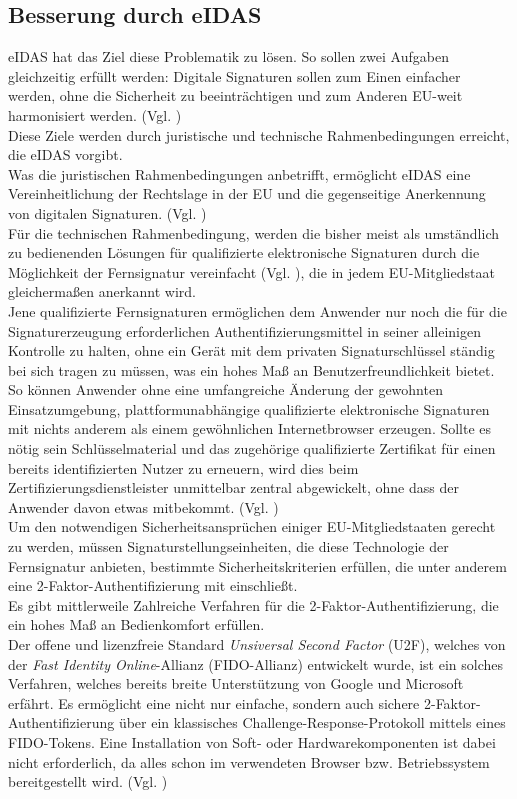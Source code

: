 \documentclass[deutsch]{lib/llncs/llncs}
\begin{document}
\subsection{Besserung durch eIDAS}
eIDAS hat das Ziel diese Problematik zu lösen. So sollen zwei Aufgaben gleichzeitig erfüllt werden: Digitale Signaturen sollen zum Einen einfacher werden, ohne die Sicherheit zu beeinträchtigen und zum Anderen EU-weit harmonisiert werden. (Vgl. \cite[S. 33]{Zitat08}) \\
Diese Ziele werden durch juristische und technische Rahmenbedingungen erreicht, die eIDAS vorgibt. \\
Was die juristischen Rahmenbedingungen anbetrifft, ermöglicht eIDAS eine Vereinheitlichung der Rechtslage in der EU und die gegenseitige Anerkennung von digitalen Signaturen. (Vgl. \cite[S. 33]{Zitat08}) \\
Für die technischen Rahmenbedingung, werden die bisher meist als umständlich zu bedienenden Lösungen für qualifizierte elektronische Signaturen durch die Möglichkeit der Fernsignatur vereinfacht (Vgl. \cite[S. 30]{Zitat08}), die in jedem EU-Mitgliedstaat gleichermaßen anerkannt wird. \\
Jene qualifizierte Fernsignaturen ermöglichen dem Anwender nur noch die für die Signaturerzeugung erforderlichen Authentifizierungsmittel in seiner alleinigen Kontrolle zu halten, ohne ein Gerät mit dem privaten Signaturschlüssel ständig bei sich tragen zu müssen, was ein hohes Maß an Benutzerfreundlichkeit bietet. So können Anwender ohne eine umfangreiche Änderung der gewohnten Einsatzumgebung, plattformunabhängige qualifizierte elektronische Signaturen mit nichts anderem als einem gewöhnlichen Internetbrowser erzeugen.  Sollte es nötig sein Schlüsselmaterial und das zugehörige qualifizierte Zertifikat für einen bereits identifizierten Nutzer zu erneuern, wird dies beim Zertifizierungsdienstleister unmittelbar zentral abgewickelt, ohne dass der Anwender davon etwas mitbekommt. (Vgl. \cite[S. 233-234]{Zitat09})\\
Um den notwendigen Sicherheitsansprüchen einiger EU-Mitgliedstaaten gerecht zu werden, müssen Signaturstellungseinheiten, die diese Technologie der Fernsignatur anbieten, bestimmte Sicherheitskriterien erfüllen, die unter anderem eine 2-Faktor-Authentifizierung mit einschließt. \\
Es gibt mittlerweile Zahlreiche Verfahren für die 2-Faktor-Authentifizierung, die ein hohes Maß an Bedienkomfort erfüllen. \\
Der offene und lizenzfreie Standard \textit{Unsiversal Second Factor} (U2F), welches von der \textit{Fast Identity Online}-Allianz (FIDO-Allianz) entwickelt wurde, ist ein solches Verfahren, welches bereits breite Unterstützung von Google und Microsoft erfährt. Es ermöglicht eine nicht nur einfache, sondern auch sichere 2-Faktor-Authentifizierung über ein klassisches Challenge-Response-Protokoll mittels eines FIDO-Tokens. Eine Installation von Soft- oder Hardwarekomponenten ist dabei nicht erforderlich, da alles schon im verwendeten  Browser bzw. Betriebssystem bereitgestellt wird. (Vgl. \cite[S. 234]{Zitat09}) \\
\end{document}
